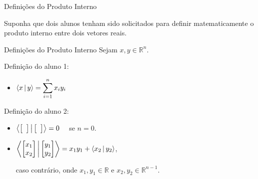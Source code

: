 
\begin{frame}{Definições do Produto Interno}
  \begin{center}
    Suponha que dois alunos tenham sido solicitados para definir matematicamente o produto interno entre dois vetores reais.
  \end{center}
\end{frame}

\begin{frame}{Definições do Produto Interno}
  Sejam $x, y \in \mathbb{R}^n$.

  \pause

  \vfill

  \begin{minipage}[t]{0.45\textwidth}
    Definição do aluno 1:
    \vspace{0.5cm}
    \begin{itemize}
      \item $\left\langle x \, \middle| \, y \right\rangle = \displaystyle\sum_{i=1}^{n} x_i y_i$
    \end{itemize}
  \end{minipage}
  \pause
  \hfill
  \vrule
  \hfill
  \begin{minipage}[t]{0.50\textwidth}
    Definição do aluno 2:
    \vspace{0.5cm}
    \begin{itemize}
      \item $\left\langle \begin{bmatrix} \hphantom{a} \end{bmatrix} \, \middle| \, \begin{bmatrix} \hphantom{a} \end{bmatrix} \right\rangle = 0 \quad$ se $n = 0$. \pause
      \vspace{0.5cm}
      \item $\left\langle \begin{bmatrix} x_1 \\ x_2 \end{bmatrix} \, \middle| \, \begin{bmatrix} y_1 \\ y_2 \end{bmatrix} \right\rangle = x_1 y_1 + \left\langle x_2 \, \middle| \, y_2 \right\rangle$,

      \vspace{0.3cm}
      caso contrário, onde $x_1, y_1 \in \mathbb{R}$ e $x_2, y_2 \in \mathbb{R}^{n-1}$.
    \end{itemize}
  \end{minipage}
  \vfill
\end{frame}

